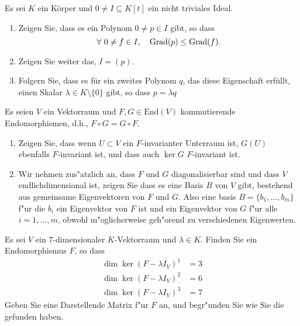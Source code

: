 \documentclass[a4,11pt]{article}
\begin{document}
\vspace*{-17mm}
{
\kopf
}


\begin{aufgabe}[4 Punkte]
Es sei $K$ ein K\"orper und $0 \neq I \subseteq K[t]$ ein nicht triviales Ideal.

\begin{enumerate}
\item Zeigen Sie, dass es ein Polynom $0 \neq p \in I$ gibt, so dass
\[
\forall \ 0 \neq f \in I, \quad \operatorname{Grad} (p) \leq \operatorname{Grad} (f).
\]
\item Zeigen Sie weiter das, $I = (p)$.
\item Folgern Sie, dass es f\"ur ein zweites Polynom $q$, das diese Eigenschaft erf\"ullt, einen Skalar $\lambda \in K \setminus \{0\}$ gibt, so dass $p = \lambda q$
\end{enumerate}

\end{aufgabe}

\begin{aufgabe}[4 Punkte]

Es seien $V$ ein Vektorraum und $F, G \in \text{End}(V)$ kommutierende Endomorphismen, d.h., $F \circ G = G \circ F$.
\begin{enumerate}
\item
Zeigen Sie, dass wenn $U \subset V$ ein $F$-invarianter Unterraum ist, $G(U)$ ebenfalls $F$-invariant ist, und dass auch $\ker G$  $F$-invariant ist.

\item Wir nehmen zus"atzlich an, dass  $F$ und $G$ diagonalisierbar sind und dass $V$ endlichdimensional ist, zeigen Sie dass es eine Basis $B$ von $V$ gibt, bestehend aus gemeinsame Eigenvektoren von $F$ und $G$. Also eine basis $B = \{ b_1, \dots , b_m\}$ f"ur die $b_i$ ein Eigenvektor von $F$ ist und ein Eigenvektor von $G$ f"ur alle $i = 1, \dots , m$, obwohl m"oglicherweise geh"orend zu verschiedenen Eigenwerten.
\end{enumerate}
\end{aufgabe}


\begin{aufgabe}[4 Punkte]
Es sei $V$ ein $7$-dimensionaler $K$-Vektorraum und $\lambda \in K$. Finden Sie ein Endomorphismus $F$, so dass
\begin{align*}
\dim \ker (F -\lambda I_V)^1 &= 3\\
\dim \ker (F -\lambda I_V)^2 &= 6 \\
\dim \ker (F -\lambda I_V)^3 &= 7
\end{align*}
Geben Sie eine Darstellende Matrix f"ur $F$ an, und begr"unden Sie wie Sie die gefunden haben.
\end{aufgabe}
\end{document}
